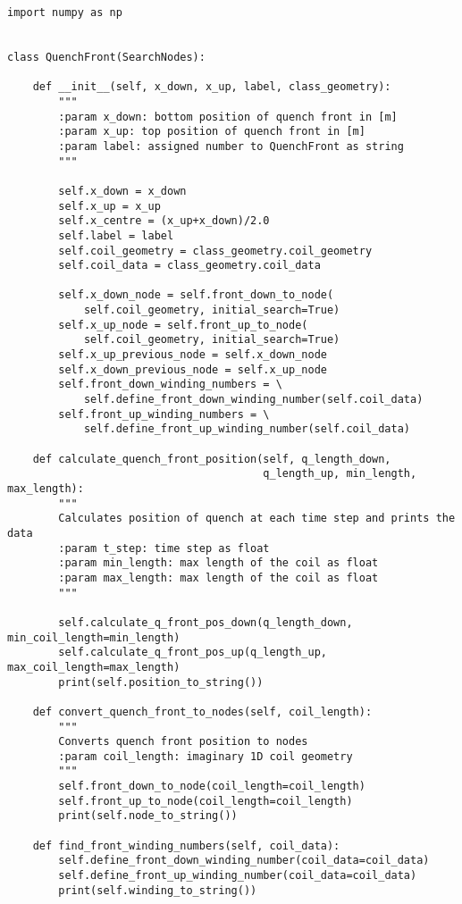 
\begin{verbatim}
import numpy as np


class QuenchFront(SearchNodes):

    def __init__(self, x_down, x_up, label, class_geometry):
        """
        :param x_down: bottom position of quench front in [m]
        :param x_up: top position of quench front in [m]
        :param label: assigned number to QuenchFront as string
        """
        
        self.x_down = x_down
        self.x_up = x_up
        self.x_centre = (x_up+x_down)/2.0
        self.label = label
        self.coil_geometry = class_geometry.coil_geometry
        self.coil_data = class_geometry.coil_data

        self.x_down_node = self.front_down_to_node(
            self.coil_geometry, initial_search=True)
        self.x_up_node = self.front_up_to_node(
            self.coil_geometry, initial_search=True)
        self.x_up_previous_node = self.x_down_node
        self.x_down_previous_node = self.x_up_node
        self.front_down_winding_numbers = \ 
            self.define_front_down_winding_number(self.coil_data)
        self.front_up_winding_numbers = \ 
            self.define_front_up_winding_number(self.coil_data)

    def calculate_quench_front_position(self, q_length_down, 
                                        q_length_up, min_length, max_length):
        """
        Calculates position of quench at each time step and prints the data
        :param t_step: time step as float
        :param min_length: max length of the coil as float
        :param max_length: max length of the coil as float
        """
        
        self.calculate_q_front_pos_down(q_length_down, min_coil_length=min_length)
        self.calculate_q_front_pos_up(q_length_up, max_coil_length=max_length)
        print(self.position_to_string())

    def convert_quench_front_to_nodes(self, coil_length):
        """
        Converts quench front position to nodes
        :param coil_length: imaginary 1D coil geometry
        """
        self.front_down_to_node(coil_length=coil_length)
        self.front_up_to_node(coil_length=coil_length)
        print(self.node_to_string())

    def find_front_winding_numbers(self, coil_data):
        self.define_front_down_winding_number(coil_data=coil_data)
        self.define_front_up_winding_number(coil_data=coil_data)
        print(self.winding_to_string())


\end{verbatim}
